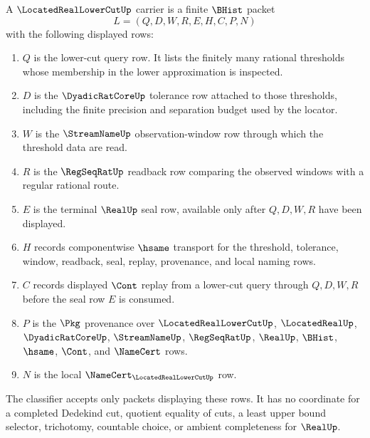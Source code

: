 \begin{definition}
\label{def:located-real-lower-cut-carrier}
A $\LocatedRealLowerCutUp$ carrier is a finite $\BHist$ packet
$$
L=(Q,D,W,R,E,H,C,P,N)
$$
with the following displayed rows:
\begin{enumerate}
\item $Q$ is the lower-cut query row. It lists the finitely many rational thresholds whose membership in the lower approximation is inspected.
\item $D$ is the $\DyadicRatCoreUp$ tolerance row attached to those thresholds, including the finite precision and separation budget used by the locator.
\item $W$ is the $\StreamNameUp$ observation-window row through which the threshold data are read.
\item $R$ is the $\RegSeqRatUp$ readback row comparing the observed windows with a regular rational route.
\item $E$ is the terminal $\RealUp$ seal row, available only after $Q,D,W,R$ have been displayed.
\item $H$ records componentwise $\hsame$ transport for the threshold, tolerance, window, readback, seal, replay, provenance, and local naming rows.
\item $C$ records displayed $\Cont$ replay from a lower-cut query through $Q,D,W,R$ before the seal row $E$ is consumed.
\item $P$ is the $\Pkg$ provenance over $\LocatedRealLowerCutUp$, $\LocatedRealUp$, $\DyadicRatCoreUp$, $\StreamNameUp$, $\RegSeqRatUp$, $\RealUp$, $\BHist$, $\hsame$, $\Cont$, and $\NameCert$ rows.
\item $N$ is the local $\NameCert_{\LocatedRealLowerCutUp}$ row.
\end{enumerate}
The classifier accepts only packets displaying these rows. It has no coordinate for a completed Dedekind cut, quotient equality of cuts, a least upper bound selector, trichotomy, countable choice, or ambient completeness for $\RealUp$.
\end{definition}

